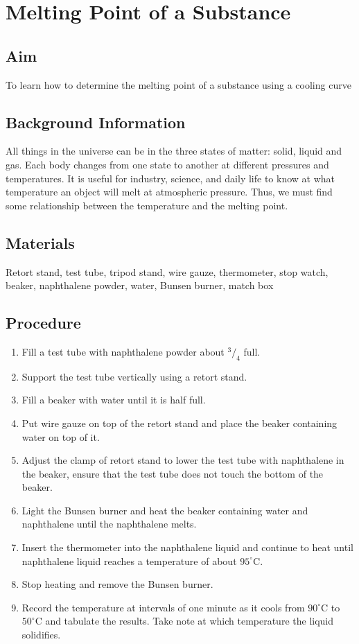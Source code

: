 \chapter{Melting Point of a Substance}

\section{Aim}
To learn how to determine the melting point of a substance using a cooling curve

\section{Background Information}
All things in the universe can be in the three states of matter: solid, liquid and gas. Each body changes from one state to another at different pressures and temperatures. It is useful for industry, science, and daily life to know at what temperature an object will melt at atmospheric pressure. Thus, we must find some relationship between the temperature and the melting point.

\section{Materials}
Retort stand, test tube, tripod stand, wire gauze, thermometer, stop watch, beaker, naphthalene powder, water, Bunsen burner, match box

\section{Procedure}
\begin{enumerate}
\item Fill a test tube with naphthalene powder about $^3/_4$ full.
\item Support the test tube vertically using a retort stand.
\item Fill a beaker with water until it is half full.
\item Put wire gauze on top of the retort stand and place the beaker containing water on top of it.
\item Adjust the clamp of retort stand to lower the test tube with naphthalene in the beaker, ensure that the test tube does not touch the bottom of the beaker.
\item Light the Bunsen burner and heat the beaker containing water and naphthalene until the naphthalene melts.
\item Insert the thermometer into the naphthalene liquid and continue to heat until naphthalene liquid reaches a temperature of about $95^\circ$C.
\item Stop heating and remove the Bunsen burner.
\item Record the temperature at intervals of one minute as it cools from $90^\circ$C to $50^\circ$C and tabulate the results. Take note at which temperature the liquid solidifies.
\end{enumerate}


